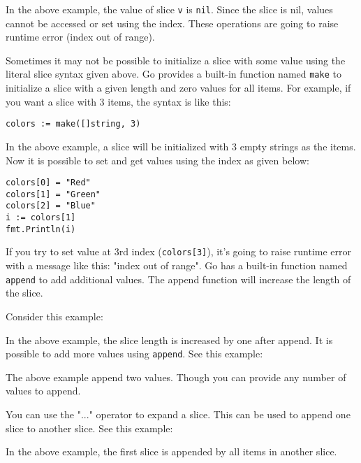 In the above example, the value of slice \texttt{v} is \texttt{nil}.
Since the slice is nil, values cannot be accessed or set using the
index.  These operations are going to raise runtime error (index out
of range).

Sometimes it may not be possible to initialize a slice with some value
using the literal slice syntax given above.  Go provides a built-in
function named \texttt{make} to initialize a slice with a given length
and zero values for all items.  For example, if you want a slice with
3 items, the syntax is like this:

\begin{lstlisting}[numbers=none]
colors := make([]string, 3)
\end{lstlisting}

In the above example, a slice will be initialized with 3 empty strings
as the items.  Now it is possible to set and get values using the
index as given below:

\begin{lstlisting}[numbers=none]
colors[0] = "Red"
colors[1] = "Green"
colors[2] = "Blue"
i := colors[1]
fmt.Println(i)
\end{lstlisting}

If you try to set value at 3rd index (\texttt{colors[3]}), it's going
to raise runtime error with a message like this: "index out of range".
Go has a built-in function named \texttt{append} to add additional
values.  The append function will increase the length of the slice.

Consider this example:



In the above example, the slice length is increased by one after
append.  It is possible to add more values using \texttt{append}.  See
this example:



The above example append two values.  Though you can provide any
number of values to append.

You can use the "..." operator to expand a slice.  This can be used to
append one slice to another slice.  See this example:



In the above example, the first slice is appended by all items in another slice.

